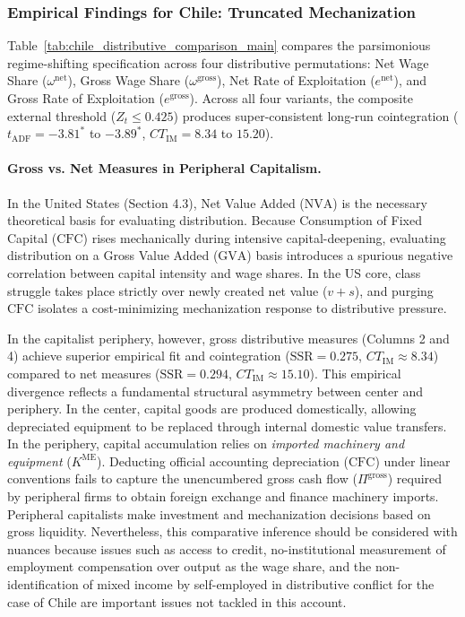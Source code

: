 \subsubsection{Empirical Findings for Chile: Truncated Mechanization}
\label{sec:442:chile_empirical_findings}

Table~\ref{tab:chile_distributive_comparison_main} compares the parsimonious regime-shifting specification across four distributive permutations: Net Wage Share ($\omega^{\text{net}}$), Gross Wage Share ($\omega^{\text{gross}}$), Net Rate of Exploitation ($e^{\text{net}}$), and Gross Rate of Exploitation ($e^{\text{gross}}$). Across all four variants, the composite external threshold ($Z_t \le 0.425$) produces super-consistent long-run cointegration ($t_{\text{ADF}} = -3.81^*$ to $-3.89^*$, $CT_{\text{IM}} = 8.34$ to $15.20$).

\paragraph{Gross vs. Net Measures in Peripheral Capitalism.} In the United States (Section 4.3), Net Value Added ($\text{NVA}$) is the necessary theoretical basis for evaluating distribution. Because Consumption of Fixed Capital ($\text{CFC}$) rises mechanically during intensive capital-deepening, evaluating distribution on a Gross Value Added ($\text{GVA}$) basis introduces a spurious negative correlation between capital intensity and wage shares. In the US core, class struggle takes place strictly over newly created net value ($v + s$), and purging $\text{CFC}$ isolates a cost-minimizing mechanization response to distributive pressure.

In the capitalist periphery, however, gross distributive measures (Columns 2 and 4) achieve superior empirical fit and cointegration ($\text{SSR} = 0.275$, $CT_{\text{IM}} \approx 8.34$) compared to net measures ($\text{SSR} = 0.294$, $CT_{\text{IM}} \approx 15.10$). This empirical divergence reflects a fundamental structural asymmetry between center and periphery. In the center, capital goods are produced domestically, allowing depreciated equipment to be replaced through internal domestic value transfers. In the periphery, capital accumulation relies on \textit{imported machinery and equipment} ($K^{\text{ME}}$). Deducting official accounting depreciation ($\text{CFC}$) under linear conventions fails to capture the unencumbered gross cash flow ($\Pi^{\text{gross}}$) required by peripheral firms to obtain foreign exchange and finance machinery imports. Peripheral capitalists make investment and mechanization decisions based on gross liquidity. Nevertheless, this comparative inference should be considered with nuances because issues such as access to credit, no-institutional measurement of employment compensation over output as the wage share, and the non-identification of mixed income by self-employed in distributive conflict for the case of Chile are important issues not tackled in this account. 


